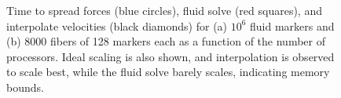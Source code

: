 \documentclass[]{article}
\begin{document}
\begin{figure}
\centering     
{}
\caption{Time to spread forces (blue circles), fluid solve (red squares), and interpolate velocities (black diamonds) for (a) $10^6$ fluid markers and (b) 8000 fibers of 128 markers each as a function of the number of processors. Ideal scaling is also shown, and interpolation is observed to scale best, while the fluid solve barely scales, indicating memory bounds. }
\label{fig:Strong}
\end{figure}





\newpage



\end{document}
